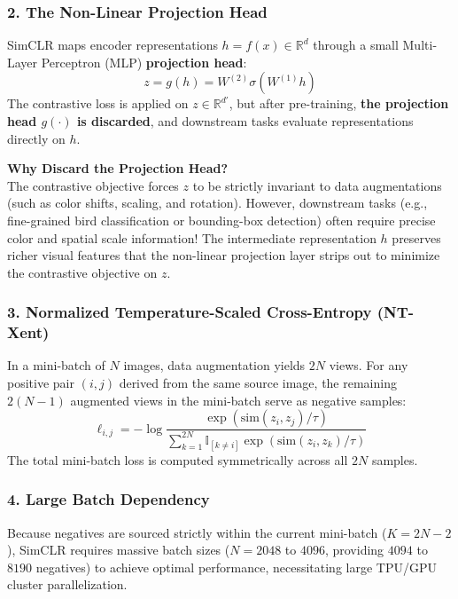 \subsubsection{2. The Non-Linear Projection Head}
SimCLR maps encoder representations $h = f(x) \in \mathbb{R}^d$ through a small Multi-Layer Perceptron (MLP) \textbf{projection head}:
\begin{equation}
    z = g(h) = W^{(2)} \sigma(W^{(1)} h)
\end{equation}
The contrastive loss is applied on $z \in \mathbb{R}^{d'}$, but after pre-training, \textbf{the projection head $g(\cdot)$ is discarded}, and downstream tasks evaluate representations directly on $h$.

\begin{InsightBox}
\textbf{Why Discard the Projection Head?} \\
The contrastive objective forces $z$ to be strictly invariant to data augmentations (such as color shifts, scaling, and rotation). However, downstream tasks (e.g., fine-grained bird classification or bounding-box detection) often require precise color and spatial scale information! The intermediate representation $h$ preserves richer visual features that the non-linear projection layer strips out to minimize the contrastive objective on $z$.
\end{InsightBox}

\subsubsection{3. Normalized Temperature-Scaled Cross-Entropy (NT-Xent)}
In a mini-batch of $N$ images, data augmentation yields $2N$ views. For any positive pair $(i, j)$ derived from the same source image, the remaining $2(N - 1)$ augmented views in the mini-batch serve as negative samples:
\begin{equation}
    \ell_{i,j} = - \log \frac{\exp(\text{sim}(z_i, z_j) / \tau)}{\sum_{k=1}^{2N} \mathbb{I}_{[k \neq i]} \exp(\text{sim}(z_i, z_k) / \tau)}
\end{equation}
The total mini-batch loss is computed symmetrically across all $2N$ samples.

\subsubsection{4. Large Batch Dependency}
Because negatives are sourced strictly within the current mini-batch ($K = 2N - 2$), SimCLR requires massive batch sizes ($N = 2048$ to $4096$, providing $4094$ to $8190$ negatives) to achieve optimal performance, necessitating large TPU/GPU cluster parallelization.

